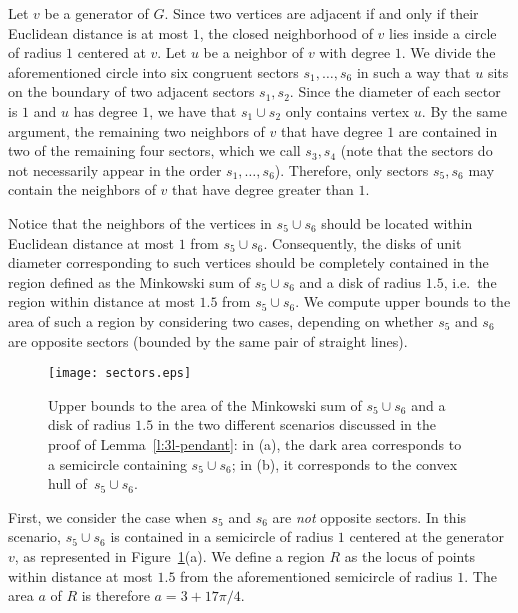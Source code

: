 \documentclass[preprint,12pt]{elsarticle}
\begin{document}
\begin{pf}
Let $v$ be a generator of $G$. Since two vertices are adjacent if and only if their Euclidean distance is at most $1$, the closed neighborhood of $v$ lies inside a circle of radius $1$ centered at $v$. Let $u$ be a neighbor of $v$ with \linebreak degree $1$. We divide the aforementioned circle into six congruent sectors $s_1,\ldots,s_6$ in such a way that $u$ sits on the boundary of two adjacent sectors $s_1,s_2$. Since the diameter of each sector is $1$ and $u$ has degree $1$, we have that $s_1 \cup s_2$ only contains vertex $u$. By the same argument, the remaining two neighbors of $v$ that have degree $1$ are contained in two of the remaining four sectors, which we call $s_3,s_4$ (note that the sectors do not necessarily appear in the order $s_1,\ldots,s_6$). Therefore, only sectors $s_5,s_6$ may contain the neighbors of $v$ that have degree greater than $1$.

Notice that the neighbors of the vertices in $s_5\cup s_6$ should be located within Euclidean distance at most $1$ from $s_5\cup s_6$. Consequently, the disks of unit diameter corresponding to such vertices should be completely contained in the region defined as the Minkowski sum of $s_5 \cup s_6$ and a disk of radius $1{.}5$, i.e.~the region within distance at most $1{.}5$ from $s_5 \cup s_6$. We compute upper bounds to the area of such a region by considering two cases, depending on whether $s_5$ and $s_6$ are opposite sectors (bounded by the same pair of straight lines).

\begin{figure}[t]
 \centering
 \texttt{[image: sectors.eps]}
 \caption{\label{f:sectors}Upper bounds to the area of the Minkowski sum of $s_5 \cup s_6$ and a disk of radius $1{.}5$ in the two different scenarios discussed in the proof of Lemma~\ref{l:3l-pendant}: in (a), the dark area corresponds to a semicircle containing $s_5 \cup s_6$; in (b), it corresponds to the convex hull of~$s_5 \cup s_6$.}
\end{figure}

First, we consider the case when $s_5$ and $s_6$ are \emph{not} opposite sectors. In this scenario, $s_5 \cup s_6$ is contained in a semicircle of radius $1$ centered at the generator $v$, as represented in Figure~\ref{f:sectors}(a). We define a region $R$ as the locus of points within distance at most $1{.}5$ from the aforementioned semicircle of radius $1$. The area $a$ of $R$ is therefore $a = 3 + 17\pi/4$.


\end{pf}
\end{document}
